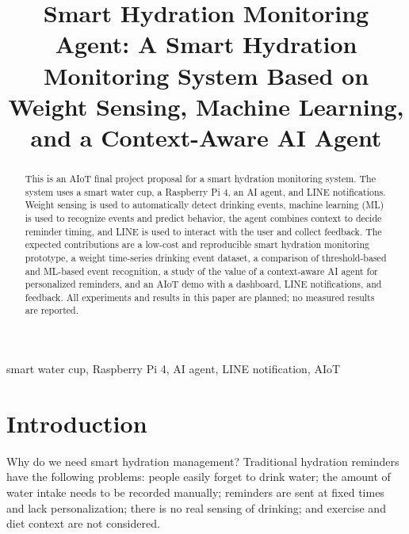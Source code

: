 \documentclass[conference]{IEEEtran}
\begin{document}
\title{Smart Hydration Monitoring Agent: A Smart Hydration Monitoring System Based on Weight Sensing, Machine Learning, and a Context-Aware AI Agent}

\author{
\and
{}
\and
{}
}

\maketitle

\begin{abstract}
This is an AIoT final project proposal for a smart hydration monitoring system. The system uses a smart water cup, a Raspberry Pi 4, an AI agent, and LINE notifications. Weight sensing is used to automatically detect drinking events, machine learning (ML) is used to recognize events and predict behavior, the agent combines context to decide reminder timing, and LINE is used to interact with the user and collect feedback. The expected contributions are a low-cost and reproducible smart hydration monitoring prototype, a weight time-series drinking event dataset, a comparison of threshold-based and ML-based event recognition, a study of the value of a context-aware AI agent for personalized reminders, and an AIoT demo with a dashboard, LINE notifications, and feedback. All experiments and results in this paper are planned; no measured results are reported.
\end{abstract}

\begin{IEEEkeywords}
smart water cup, Raspberry Pi 4, AI agent, LINE notification, AIoT
\end{IEEEkeywords}

\section{Introduction}

Why do we need smart hydration management? Traditional hydration reminders have the following problems: people easily forget to drink water; the amount of water intake needs to be recorded manually; reminders are sent at fixed times and lack personalization; there is no real sensing of drinking; and exercise and diet context are not considered.
\end{document}
